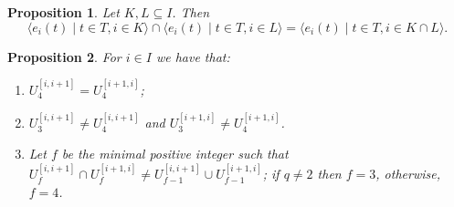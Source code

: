 \documentclass[10pt,a4paper]{amsart}
\newtheorem{proposition}{Proposition}
\begin{document}
\begin{proposition}\label{prop:UniT_IP}
Let $K,L\subseteq I$. Then $$\langle e_{i}(t)\mid t\in T, i\in K \rangle \cap \langle e_{i}(t)\mid t\in T, i\in L \rangle = \langle e_{i}(t)\mid t\in T, i\in K\cap L \rangle.$$
\end{proposition}

\begin{proposition}\label{prop:diag_props}
    For $i\in I$ we have that:
    \begin{enumerate}
        \item $ U^{[i,i+1]}_4 = U^{[i+1,i]}_4$;
        \item $U^{[i,i+1]}_3 \neq U^{[i,i+1]}_4$ and $U^{[i+1,i]}_3 \neq U^{[i+1,i]}_4$.
        \item Let $f$ be the minimal positive integer such that $U^{[i,i+1]}_f\cap U^{[i+1,i]}_f\neq U^{[i,i+1]}_{f-1}\cup U^{[i+1,i]}_{f-1}$; if $q\neq 2$ then $f=3$, otherwise, $f=4$.
    \end{enumerate}
\end{proposition}
\end{document}
